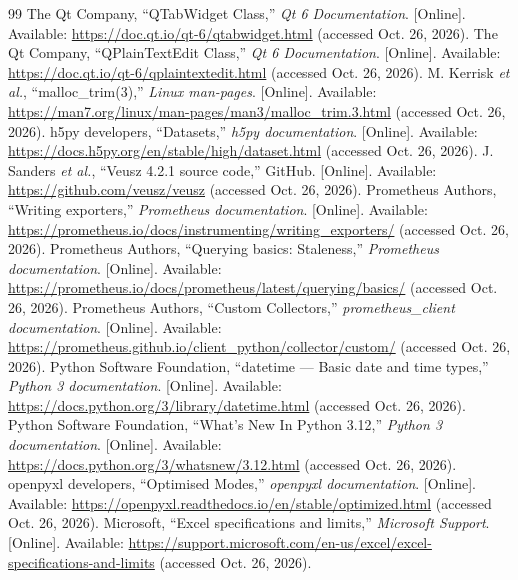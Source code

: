 \documentclass[11pt,a4paper]{article}
\begin{document}
\begingroup\raggedright
\begin{thebibliography}{99}
 The Qt Company, ``QTabWidget Class,'' \emph{Qt 6 Documentation}. [Online]. Available: \url{https://doc.qt.io/qt-6/qtabwidget.html} (accessed Oct. 26, 2026).
 The Qt Company, ``QPlainTextEdit Class,'' \emph{Qt 6 Documentation}. [Online]. Available: \url{https://doc.qt.io/qt-6/qplaintextedit.html} (accessed Oct. 26, 2026).
 M. Kerrisk \emph{et al.}, ``malloc\_trim(3),'' \emph{Linux man-pages}. [Online]. Available: \url{https://man7.org/linux/man-pages/man3/malloc_trim.3.html} (accessed Oct. 26, 2026).
 h5py developers, ``Datasets,'' \emph{h5py documentation}. [Online]. Available: \url{https://docs.h5py.org/en/stable/high/dataset.html} (accessed Oct. 26, 2026).
 J. Sanders \emph{et al.}, ``Veusz 4.2.1 source code,'' GitHub. [Online]. Available: \url{https://github.com/veusz/veusz} (accessed Oct. 26, 2026).
 Prometheus Authors, ``Writing exporters,'' \emph{Prometheus documentation}. [Online]. Available: \url{https://prometheus.io/docs/instrumenting/writing_exporters/} (accessed Oct. 26, 2026).
 Prometheus Authors, ``Querying basics: Staleness,'' \emph{Prometheus documentation}. [Online]. Available: \url{https://prometheus.io/docs/prometheus/latest/querying/basics/} (accessed Oct. 26, 2026).
 Prometheus Authors, ``Custom Collectors,'' \emph{prometheus\_client documentation}. [Online]. Available: \url{https://prometheus.github.io/client_python/collector/custom/} (accessed Oct. 26, 2026).
 Python Software Foundation, ``datetime --- Basic date and time types,'' \emph{Python 3 documentation}. [Online]. Available: \url{https://docs.python.org/3/library/datetime.html} (accessed Oct. 26, 2026).
 Python Software Foundation, ``What's New In Python 3.12,'' \emph{Python 3 documentation}. [Online]. Available: \url{https://docs.python.org/3/whatsnew/3.12.html} (accessed Oct. 26, 2026).
 openpyxl developers, ``Optimised Modes,'' \emph{openpyxl documentation}. [Online]. Available: \url{https://openpyxl.readthedocs.io/en/stable/optimized.html} (accessed Oct. 26, 2026).
 Microsoft, ``Excel specifications and limits,'' \emph{Microsoft Support}. [Online]. Available: \url{https://support.microsoft.com/en-us/excel/excel-specifications-and-limits} (accessed Oct. 26, 2026).

\end{thebibliography}
\end{document}
